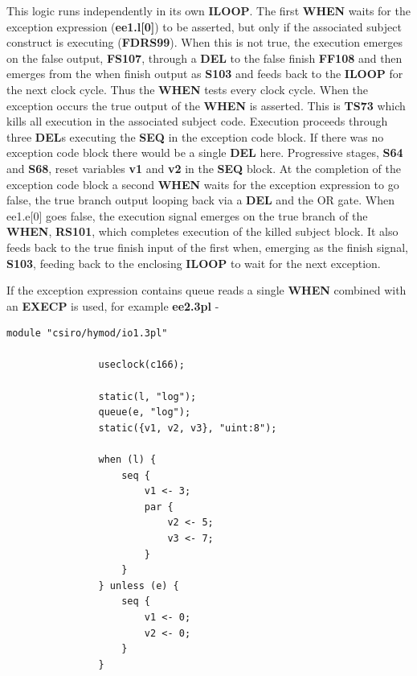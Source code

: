 \documentclass[10pt,a4paper,twoside,fleqn]{book}
\begin{document}
            This logic runs independently in its own {\bf ILOOP}. The first {\bf
            WHEN} waits for the exception expression ({\bf ee1.l[0]}) to be
            asserted, but only if the associated subject construct is executing
            ({\bf FDRS99}). When this is not true, the execution emerges on the
            false output, {\bf FS107}, through a {\bf DEL} to the false finish {\bf
            FF108} and then emerges from the when finish output as {\bf S103} and
            feeds back to the {\bf ILOOP} for the next clock cycle. Thus the {\bf
            WHEN} tests every clock cycle. When the exception occurs the true output
            of the {\bf WHEN} is asserted. This is {\bf TS73} which kills all
            execution in the associated subject code. Execution proceeds through
            three {\bf DEL}s executing the {\bf SEQ} in the exception code block. If
            there was no exception code block there would be a single {\bf DEL}
            here. Progressive stages, {\bf S64} and {\bf S68}, reset variables {\bf
            v1} and {\bf v2} in the {\bf SEQ} block. At the completion of the
            exception code block a second {\bf WHEN} waits for the exception
            expression to go false, the true branch output looping back via a {\bf
            DEL} and the OR gate. When ee1.e[0] goes false, the execution signal
            emerges on the true branch of the {\bf WHEN}, {\bf RS101}, which
            completes execution of the killed subject block. It also feeds back to
            the true finish input of the first when, emerging as the finish signal,
            {\bf S103}, feeding back to the enclosing {\bf ILOOP} to wait for the
            next exception.

            If the exception expression contains queue reads a single {\bf WHEN}
            combined with an {\bf EXECP} is used, for example {\bf ee2.3pl} -

            \begin{lstlisting}[gobble=12, language=threepl]
                module "csiro/hymod/io1.3pl"

                useclock(c166);

                static(l, "log");
                queue(e, "log");
                static({v1, v2, v3}, "uint:8");

                when (l) {
                    seq {
                        v1 <- 3;
                        par {
                            v2 <- 5;
                            v3 <- 7;
                        }
                    }
                } unless (e) {
                    seq {
                        v1 <- 0;
                        v2 <- 0;
                    }
                }
            \end{lstlisting}
            
\end{document}
